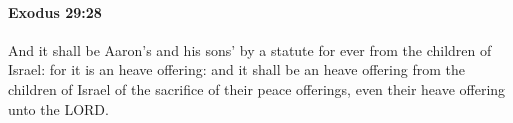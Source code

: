 
		\paragraph{Exodus 29:28} %
			\label{EXODUS-29-28}

			And it shall be Aaron's and his sons' by a statute for ever from the children of Israel: for it is an heave offering: and it shall be an heave offering from the children of Israel of the sacrifice of their peace offerings, even their heave offering unto the LORD.


